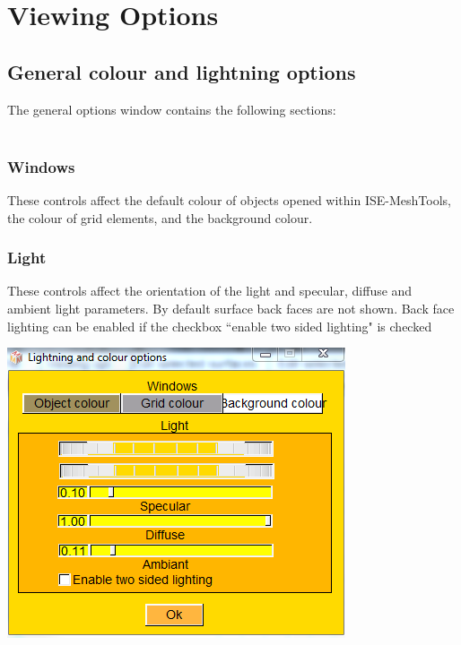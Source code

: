 




\chapter{Viewing Options}
\minitoc  

\section{General colour and lightning options}

The general options window contains the following
sections:\\\\
\noindent
\begin{minipage}{0.55\textwidth}
\subsection{Windows}
These controls affect the default colour of objects opened within ISE-MeshTools, the colour of grid elements, and the background colour.
\subsection{Light}
These controls affect the orientation of the light and specular, diffuse and ambient light parameters. By default surface back faces are not shown. Back face lighting can be enabled if the checkbox ``enable two sided lighting" is checked

\end{minipage}  
 \begin{minipage}{0.45\textwidth}\centering
  \includegraphics[scale=0.4]{images/Viewing_options/General_colour.png}
 \end{minipage} 
\noindent






